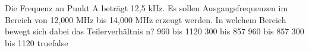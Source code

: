     {Die Frequenz an Punkt A beträgt 12,5 kHz. Es sollen Ausgangsfrequenzen im Bereich von 12,000 MHz bis 14,000 MHz erzeugt werden. In welchem Bereich bewegt sich dabei das Teilerverhältnis n?}
    {960 bis 1120}
    {300 bis 857}
    {960 bis 857}
    {300 bis 1120}
    {true}{false}